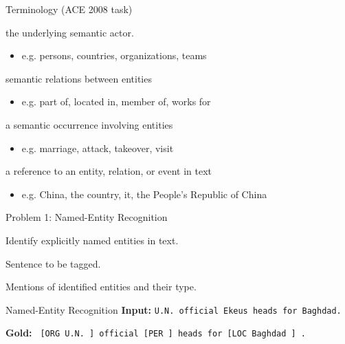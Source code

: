 \documentclass{beamer}
\begin{document}
\begin{frame}{Terminology (ACE 2008 task)}
  \begin{description} \itemsep 20pt
    
  \item[Entity] the underlying semantic actor.
    \begin{itemize}
    \item e.g. persons, countries, organizations, teams
    \end{itemize}
   
  \item[Relation] semantic relations between entities
    \begin{itemize}
    \item e.g. part of, located in, member of, works for
    \end{itemize}

  \item[Event] a semantic occurrence involving entities
    \begin{itemize}
    \item e.g. marriage, attack, takeover, visit
    \end{itemize}

  \item[Mention] a reference to an entity, relation, or event in text
    \begin{itemize}
    \item e.g. China, the country, it, the People's Republic of China
    \end{itemize}
  \end{description}
\end{frame}

\begin{frame}{Problem 1: Named-Entity Recognition}
  \begin{description} \itemsep 20pt
  \item[Goal] Identify explicitly named entities in text.
  \item[Input] Sentence to be tagged. 
  \item[Output] Mentions of identified entities and their type. 
  \end{description}  

\end{frame}

\begin{frame}{Named-Entity Recognition}
  \textbf{Input:} \texttt{U.N. official Ekeus heads for Baghdad. }
  \air
  
  \textbf{Gold:} \texttt{ [ORG \alert{U.N.} ] official [PER  ] heads for [LOC \alert{Baghdad} ] .  } 
\end{frame}
\end{document}
